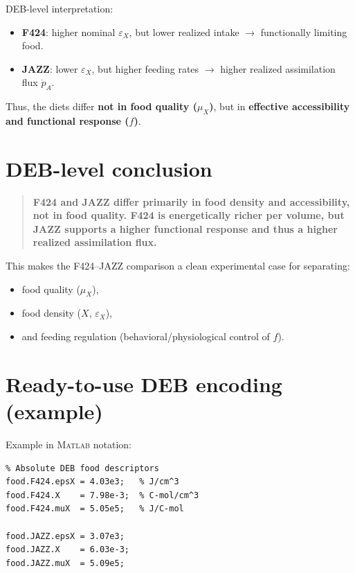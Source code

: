 \documentclass[11pt]{article}
\begin{document}
DEB-level interpretation:
\begin{itemize}
  \item \textbf{F424}: higher nominal $\varepsilon_X$, but lower realized intake $\rightarrow$ functionally limiting food.
  \item \textbf{JAZZ}: lower $\varepsilon_X$, but higher feeding rates $\rightarrow$ higher realized assimilation flux $\dot p_A$.
\end{itemize}

Thus, the diets differ \textbf{not in food quality ($\mu_X$)}, but in \textbf{effective accessibility and functional response ($f$)}.

\section{DEB-level conclusion}

\begin{quote}
\textbf{F424 and JAZZ differ primarily in food density and accessibility, not in food quality. F424 is energetically richer per volume, but JAZZ supports a higher functional response and thus a higher realized assimilation flux.}
\end{quote}

This makes the F424--JAZZ comparison a clean experimental case for separating:
\begin{itemize}
  \item food quality ($\mu_X$),
  \item food density ($X$, $\varepsilon_X$),
  \item and feeding regulation (behavioral/physiological control of $f$).
\end{itemize}

\section{Ready-to-use DEB encoding (example)}

\noindent Example in \textsc{Matlab} notation:

\begin{verbatim}
% Absolute DEB food descriptors
food.F424.epsX = 4.03e3;   % J/cm^3
food.F424.X    = 7.98e-3;  % C-mol/cm^3
food.F424.muX  = 5.05e5;   % J/C-mol

food.JAZZ.epsX = 3.07e3;
food.JAZZ.X    = 6.03e-3;
food.JAZZ.muX  = 5.09e5;
\end{verbatim}
\end{document}
